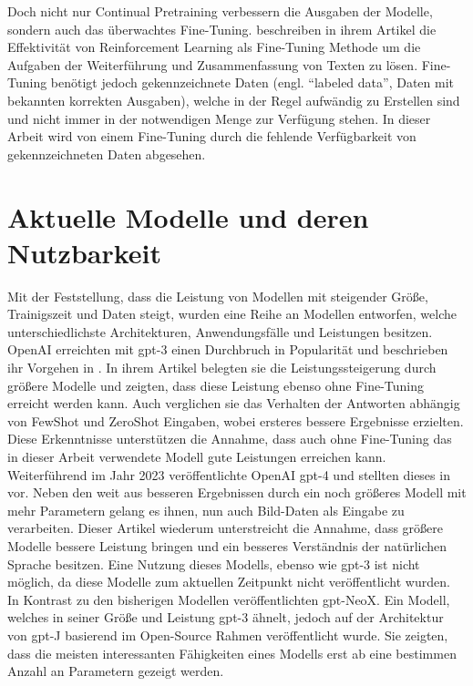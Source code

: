 Doch nicht nur Continual Pretraining verbessern die Ausgaben der Modelle, sondern auch das überwachtes Fine-Tuning. 
\citet{finetuning} beschreiben in ihrem Artikel die Effektivität von Reinforcement Learning als Fine-Tuning Methode um die Aufgaben der Weiterführung und Zusammenfassung von Texten zu lösen. 
Fine-Tuning benötigt jedoch gekennzeichnete Daten (engl. \enquote{labeled data}, Daten mit bekannten korrekten Ausgaben), welche in der Regel aufwändig zu Erstellen sind und nicht immer in der notwendigen Menge zur Verfügung stehen. 
In dieser Arbeit wird von einem Fine-Tuning durch die fehlende Verfügbarkeit von gekennzeichneten Daten abgesehen.\\

\section{Aktuelle Modelle und deren Nutzbarkeit}

Mit der Feststellung, dass die Leistung von Modellen mit steigender Größe, Trainigszeit und Daten steigt, wurden eine Reihe an Modellen entworfen, welche unterschiedlichste Architekturen, Anwendungsfälle und Leistungen besitzen. 
OpenAI erreichten mit \ac{gpt}-3 einen Durchbruch in Popularität und beschrieben ihr Vorgehen in \citet{gpt3}.
In ihrem Artikel belegten sie die Leistungssteigerung durch größere Modelle und zeigten, dass diese Leistung ebenso ohne Fine-Tuning erreicht werden kann. 
Auch verglichen sie das Verhalten der Antworten abhängig von FewShot und ZeroShot Eingaben, wobei ersteres bessere Ergebnisse erzielten. 
Diese Erkenntnisse unterstützen die Annahme, dass auch ohne Fine-Tuning das in dieser Arbeit verwendete Modell gute Leistungen erreichen kann.\\

Weiterführend im Jahr 2023 veröffentlichte OpenAI \ac{gpt}-4 und stellten dieses in \citet{gpt4} vor. 
Neben den weit aus besseren Ergebnissen durch ein noch größeres Modell mit mehr Parametern gelang es ihnen, nun auch Bild-Daten als Eingabe zu verarbeiten. 
Dieser Artikel wiederum unterstreicht die Annahme, dass größere Modelle bessere Leistung bringen und ein besseres Verständnis der natürlichen Sprache besitzen.
Eine Nutzung dieses Modells, ebenso wie \ac{gpt}-3 ist nicht möglich, da diese Modelle zum aktuellen Zeitpunkt nicht veröffentlicht wurden.\\

In Kontrast zu den bisherigen Modellen veröffentlichten \citet{gpt_neox} \ac{gpt}-NeoX. 
Ein Modell, welches in seiner Größe und Leistung \ac{gpt}-3 ähnelt, jedoch auf der Architektur von \ac{gpt}-J basierend im Open-Source Rahmen veröffentlicht wurde. 
Sie zeigten, dass die meisten interessanten Fähigkeiten eines Modells erst ab eine bestimmen Anzahl an Parametern gezeigt werden.\\

